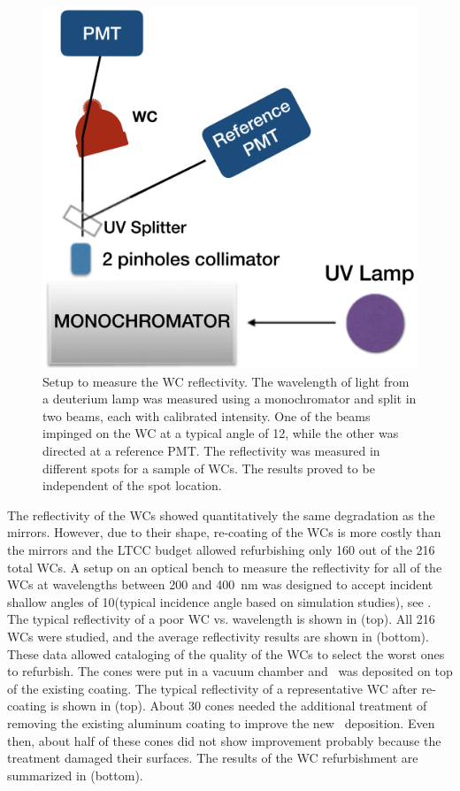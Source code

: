 \begin{figure}[!h]
	\centering
	\includegraphics[width=0.98\columnwidth,keepaspectratio]{img/wcSetup.png}
	\caption{Setup to measure the WC reflectivity. The wavelength of light from a deuterium lamp was measured
          using a monochromator and split in two beams, each with calibrated intensity. One of the beams impinged on
          the WC at a typical angle of 12\mdeg, while the other was directed at a reference PMT. The reflectivity was
          measured in different spots for a sample of WCs.  The results proved to be independent of the spot location.}
	\label{fig:wcSetup}
\end{figure}

The reflectivity of the WCs showed quantitatively the same degradation as the mirrors. However, due to their shape,
re-coating of the WCs is more costly than the mirrors and the LTCC budget allowed refurbishing only 160 out of the
216 total WCs. A setup on an optical bench to measure the reflectivity for all of the WCs at wavelengths between 200
and 400~nm was designed to accept incident shallow angles of 10\mdeg (typical incidence angle based on
simulation studies), see . The typical reflectivity of a poor WC vs. wavelength is shown in 
(top). All 216 WCs were studied, and the average reflectivity results are shown in  (bottom). These
data allowed cataloging of the quality of the WCs to select the worst ones to refurbish. The cones were put in a vacuum
chamber and \coating\ was deposited on top of the existing coating. The typical reflectivity of a representative WC
after re-coating is shown in  (top). About 30 cones needed the additional treatment of removing the
existing aluminum coating to improve the new \coating\ deposition. Even then, about half of these cones did not show
improvement probably because the treatment damaged their surfaces.
The results of the WC refurbishment are summarized in  (bottom).

